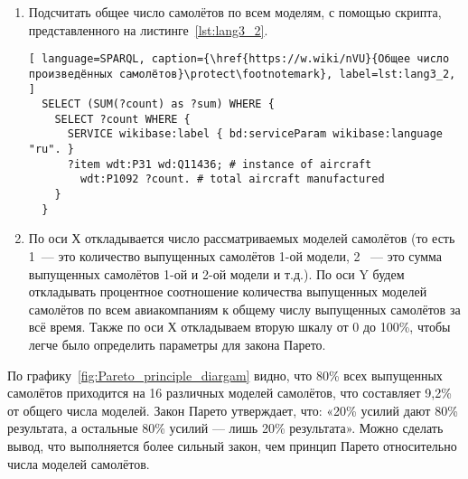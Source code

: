 \begin{enumerate} 
  \item Подсчитать общее число самолётов по всем моделям, с помощью скрипта, представленного на листинге~\ref{lst:lang3_2}.
  
  \begin{lstlisting}[ language=SPARQL, caption={\href{https://w.wiki/nVU}{Общее число произведённых самолётов}\protect\footnotemark}, label=lst:lang3_2, ]
  SELECT (SUM(?count) as ?sum) WHERE {
    SELECT ?count WHERE {
      SERVICE wikibase:label { bd:serviceParam wikibase:language "ru". }
      ?item wdt:P31 wd:Q11436; # instance of aircraft
        wdt:P1092 ?count. # total aircraft manufactured
    }
  }
  \end{lstlisting}
  
  
  \item По оси Х откладывается число рассматриваемых моделей самолётов (то есть 1~--- это количество выпущенных самолётов 1-ой модели, 2 ~--- это сумма выпущенных самолётов 1-ой и 2-ой модели и т.д.). По оси Y будем откладывать процентное соотношение количества выпущенных моделей самолётов по всем авиакомпаниям к общему числу выпущенных самолётов за всё время. Также по оси Х откладываем вторую шкалу от 0 до 100\%, чтобы легче было определить параметры для закона Парето.
\end{enumerate}

\begin{figure*}[h]

    \setlength{\fboxsep}{0pt}%
    \setlength{\fboxrule}{1pt}%

	\caption{Процентное соотношение количества выпущенных моделей самолётов по всем авиакомпаниям к общему числу выпущенных самолётов за всё время, 2020.}%
    \label{fig:Pareto_principle_diargam}%
\end{figure*}

По графику~\ref{fig:Pareto_principle_diargam} видно, что 80\% всех выпущенных самолётов приходится на 16 различных моделей самолётов, что составляет 9,2\% от общего числа моделей. Закон Парето утверждает, что: «20\% усилий дают 80\% результата, а остальные 80\% усилий — лишь 20\% результата». Можно сделать вывод, что выполняется более сильный закон, чем принцип Парето относительно числа моделей самолётов.


